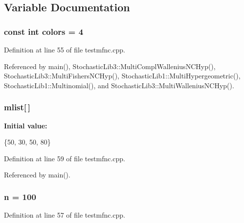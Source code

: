 \subsection{Variable Documentation}
\subsubsection[{colors}]{\setlength{\rightskip}{0pt plus 5cm}const int colors = 4}\label{rnd_2testmfnc_8cpp_a3d13a5292cc6f3ed866f7d30b7ac3d06}


Definition at line 55 of file testmfnc.\-cpp.



Referenced by main(), Stochastic\-Lib3\-::\-Multi\-Compl\-Wallenius\-N\-C\-Hyp(), Stochastic\-Lib3\-::\-Multi\-Fishers\-N\-C\-Hyp(), Stochastic\-Lib1\-::\-Multi\-Hypergeometric(), Stochastic\-Lib1\-::\-Multinomial(), and Stochastic\-Lib3\-::\-Multi\-Wallenius\-N\-C\-Hyp().

\subsubsection[{mlist}]{ mlist[$\,$]}\label{rnd_2testmfnc_8cpp_ac30a614d36a3ccd2657a4be3eaf6b102}
{\bfseries Initial value\-:}
\begin{DoxyCode}
 
\{50, 30, 50, 80\}
\end{DoxyCode}


Definition at line 59 of file testmfnc.\-cpp.



Referenced by main().

\subsubsection[{n}]{ n = 100}\label{rnd_2testmfnc_8cpp_a4e34aefb3cc5403a07c020131077100a}


Definition at line 57 of file testmfnc.\-cpp.



